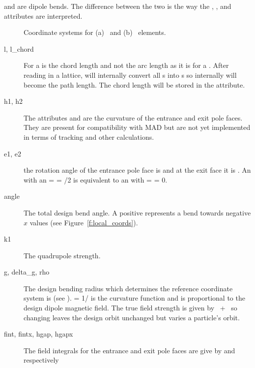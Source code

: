  and  are dipole bends. The difference between
the two is the way the , , and  attributes are interpreted.
\begin{figure}
  \centering
  \hspace{1cm}
  \caption{Coordinate systems for (a) \ and (b) \ 
  elements.}
\end{figure}

  \begin{description}
  \item[l, l\_chord]  
For a   is the chord length and not the arc length as
it is for a .  After reading in a lattice, \bmad will
internally convert all s into \vn{Sbend}s so internally
\vn{l} will become the path length. The chord length will be stored in
the \vn{l_chord} attribute.
  \item[h1, h2]
The attributes  and  are the curvature of the entrance
and exit pole faces. They are present for compatibility with MAD but
are not yet implemented in terms of tracking and other calculations.
  \item[e1, e2]
the rotation angle of the entrance pole face is  and at the exit
face it is . An \vn{Sbend} with an  = \vn{e2} =
/2 is equivalent to an  with \vn{e1} =  =
0.
  \item[angle]
The total design bend angle. A positive  represents a
bend towards negative $x$ values (see Figure~\ref{f:local_coords}).
  \item[k1]
The quadrupole strength.
  \item[g, delta\_g, rho]
The design bending radius which determines the reference coordinate
system is  (see \sref{s:ref}).  \vn{g} = 1/\vn{rho} is
the curvature function and is proportional to the design dipole
magnetic field. The true field strength is given by
~+~ so changing \vn{delta_g} leaves the design orbit
unchanged but varies a particle's orbit.
  \item[fint, fintx, hgap, hgapx]
The field integrals for the entrance and
exit pole faces are give by  and  respectively

\end{description}

